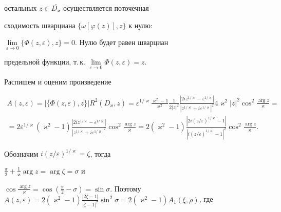 остальных $z \in \overline {D_{\varkappa}} $ осуществляется поточечная 


сходимость шварциана $\{\omega [{\varphi (z)}],z\}$ к нулю:


$\lim\limits_{\varepsilon \to 0} \{\Phi 


({z,\varepsilon} ),z\}=0$. Нулю будет равен шварциан 


предельной функции, т.\,к. $\lim\limits_{\varepsilon \to 0} \Phi 


({z,\varepsilon} )=z$.





Распишем и оценим произведение 


\begin{multline*}


A({z,\varepsilon} )=|\{\Phi ({z,\varepsilon} 


),z\} |R^2({D_{\varkappa},z})=


\varepsilon^{1/\varkappa} \frac{{\varkappa^2-1}}{{\varkappa 


^2}}\frac{1}{{2|z|^2}}\frac{{|2iz^{1/\varkappa}-\varepsilon^{1/\varkappa 


}|}}{{|z^{1/\varkappa}+i\varepsilon^{1/\varkappa} |^2}}4\varkappa 


^2|z|^2\cos^2\frac{\arg z}{\varkappa}= \\


%


=2\varepsilon^{1/\varkappa} ({\varkappa^2-1} 


)\frac{{|2iz^{1/\varkappa}-\varepsilon^{1/\varkappa} |}}{{|z^{1/\varkappa} 


+ i\varepsilon^{1/\varkappa} |^2}}\cos^2\frac{\arg z}{\varkappa} 


=2({\varkappa^2-1})\frac{{|2i({z/\varepsilon} 


)^{1/\varkappa}-1|}}{{|i({z/\varepsilon} )^{1/\varkappa}-


1|^2}}\cos^2\frac{\arg z}{\varkappa}.


\end{multline*}


Обозначим $i({z/\varepsilon} )^{1/\varkappa}=\zeta $, тогда 


$\frac{{\pi}}{2}+\frac{1}{{\varkappa}}\arg z=\arg\zeta=\sigma$ и 


$\cos\frac{{\arg z}}{{\varkappa}}=\cos({\frac{{\pi}}{2}-\sigma})=


\sin\sigma$. Поэтому $A({z,\varepsilon} )=2(


{\varkappa^2-1})\frac{{|2\zeta-1|}}{{|\zeta-


1|^2}}\sin^2\sigma =2({\varkappa^2-1})A_1 ({\xi ,\rho} )$, где 


